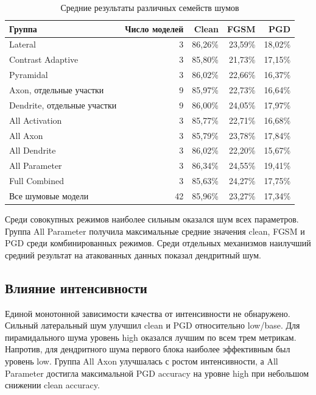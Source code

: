\documentclass[a4paper]{article}
\begin{document}
\begin{table}[H]
\centering
\small
\begin{tabular}{lrrrr}
\toprule
Группа & Число моделей & Clean & FGSM & PGD\\
\midrule
Lateral & 3 & 86{,}26\% & 23{,}59\% & 18{,}02\%\\
Contrast Adaptive & 3 & 85{,}80\% & 21{,}73\% & 17{,}15\%\\
Pyramidal & 3 & 86{,}02\% & 22{,}66\% & 16{,}37\%\\
Axon, отдельные участки & 9 & 85{,}97\% & 22{,}73\% & 16{,}64\%\\
Dendrite, отдельные участки & 9 & 86{,}00\% & 24{,}05\% & 17{,}97\%\\
All Activation & 3 & 85{,}77\% & 22{,}71\% & 16{,}68\%\\
All Axon & 3 & 85{,}79\% & 23{,}78\% & 17{,}84\%\\
All Dendrite & 3 & 86{,}02\% & 22{,}20\% & 15{,}67\%\\
All Parameter & 3 & 86{,}34\% & 24{,}55\% & 19{,}41\%\\
Full Combined & 3 & 85{,}63\% & 24{,}27\% & 17{,}75\%\\
Все шумовые модели & 42 & 85{,}96\% & 23{,}27\% & 17{,}34\%\\
\bottomrule
\end{tabular}
\caption{Средние результаты различных семейств шумов}
\label{tab:groups}
\end{table}

Среди совокупных режимов наиболее сильным оказался шум всех параметров. Группа All Parameter получила максимальные средние значения clean, FGSM и PGD среди комбинированных режимов. Среди отдельных механизмов наилучший средний результат на атакованных данных показал дендритный шум.

\subsection{Влияние интенсивности}

Единой монотонной зависимости качества от интенсивности не обнаружено. Сильный латеральный шум улучшил clean и PGD относительно low/base. Для пирамидального шума уровень high оказался лучшим по всем трем метрикам. Напротив, для дендритного шума первого блока наиболее эффективным был уровень low. Группа All Axon улучшалась с ростом интенсивности, а All Parameter достигла максимальной PGD accuracy на уровне high при небольшом снижении clean accuracy.
\end{document}
